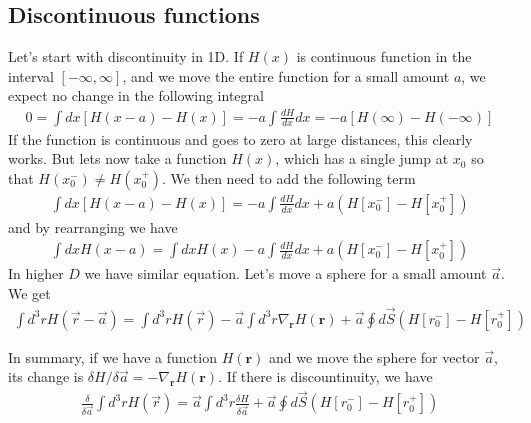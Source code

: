 \documentclass[aps,prb,floatfix,epsfig,singlecolumn,showpacs,preprintnumbers]{revtex4}
\renewcommand{\vr}{{\mathbf{r}}}
\begin{document}
\subsection{Discontinuous functions}
\label{discontinuity}

Let's start with discontinuity in 1D. If $H(x)$ is continuous
function in the interval $[-\infty,\infty]$, and we move the entire
function  for a small amount $a$, we expect no change in the
following integral
\begin{eqnarray}
0=\int dx[H(x-a)-H(x)] = -a\int \frac{dH}{dx}dx = -a [H(\infty)-H(-\infty)]
\end{eqnarray}
If the function is continuous and goes to zero at large distances,
this clearly works. But lets now take a function $H(x)$, which has a
single jump at $x_0$ so that $H(x_0^-) \ne H(x_0^+)$. We then need to
add the following term
\begin{eqnarray}
\int dx[H(x-a)-H(x)] = -a\int \frac{dH}{dx}dx +a (H[x_0^-]-H[x_0^+])
\end{eqnarray}
and by rearranging we have
\begin{eqnarray}
\int dx H(x-a) = \int dx H(x)  -a\int \frac{dH}{dx}dx +a (H[x_0^-]-H[x_0^+])
\end{eqnarray}
In higher $D$ we have similar equation. Let's move a sphere for a
small amount $\vec{a}$. We get
\begin{eqnarray}
\int d^3r H(\vec{r}-\vec{a}) = \int d^3r H(\vec{r})  
-\vec{a}\int d^3r  \nabla_\vr H(\vr)  +\vec{a} \oint d\vec{S} (H[r_0^-]-H[r_0^+])
\end{eqnarray}

In summary, if we have a function $H(\vr)$ and we move the sphere for
vector $\vec{a}$, its change is ${\delta
  H}/{\delta\vec{a}}=-\nabla_\vr H(\vr)$. If there is discountinuity, we have
\begin{eqnarray}
\frac{\delta}{\delta\vec{a}} \int d^3r H(\vec{r}) =   
\vec{a}\int d^3r \frac{ \delta H}{\delta\vec{a}}  +
\vec{a}\oint d\vec{S} (H[r_0^-]-H[r_0^+])
\end{eqnarray}
\end{document}

